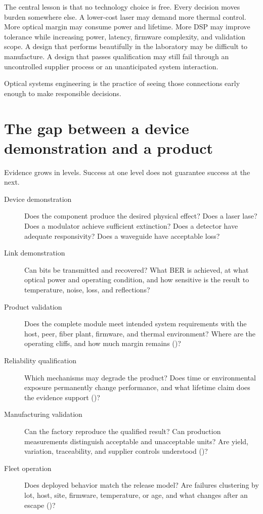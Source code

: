 The central lesson is that no technology choice is free. Every decision moves
burden somewhere else. A lower-cost laser may demand more thermal control. More
optical margin may consume power and lifetime. More DSP may improve tolerance
while increasing power, latency, firmware complexity, and validation scope. A
design that performs beautifully in the laboratory may be difficult to
manufacture. A design that passes qualification may still fail through an
uncontrolled supplier process or an unanticipated system interaction.

Optical systems engineering is the practice of seeing those connections early
enough to make responsible decisions.

\section{The gap between a device demonstration and a product}
\label{sec:systems-engineering-loop}

Evidence grows in levels. Success at one level does not guarantee success at the
next.

\begin{description}
\item[Device demonstration] Does the component produce the desired physical
      effect? Does a laser lase? Does a modulator achieve sufficient extinction?
      Does a detector have adequate responsivity? Does a waveguide have
      acceptable loss?
\item[Link demonstration] Can bits be transmitted and recovered? What BER is
      achieved, at what optical power and operating condition, and how sensitive
      is the result to temperature, noise, loss, and reflections?
\item[Product validation] Does the complete module meet intended system
      requirements with the host, peer, fiber plant, firmware, and thermal
      environment? Where are the operating cliffs, and how much margin remains
      ()?
\item[Reliability qualification] Which mechanisms may degrade the product? Does
      time or environmental exposure permanently change performance, and what
      lifetime claim does the evidence support ()?
\item[Manufacturing validation] Can the factory reproduce the qualified result?
      Can production measurements distinguish acceptable and unacceptable units?
      Are yield, variation, traceability, and supplier controls understood
      ()?
\item[Fleet operation] Does deployed behavior match the release model? Are
      failures clustering by lot, host, site, firmware, temperature, or age, and
      what changes after an escape ()?
\end{description}

